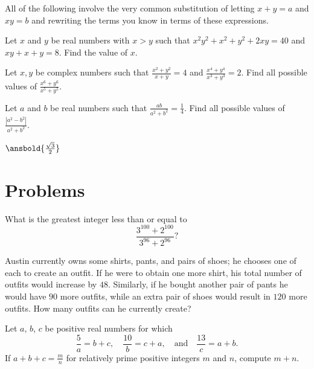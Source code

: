 \documentclass[mast]{lucky}
\begin{document}
All of the following involve the very common substitution of letting $x+y=a$ and $xy=b$ and rewriting the terms you know in terms of these expressions.
\begin{exam}
Let $x$ and $y$ be real numbers with $x > y$ such that $x^2 y^2 + x^2 + y^2 + 2xy = 40$ and $xy + x + y = 8$. Find
the value of $x$.
\end{exam}

\begin{exam}
Let $x,y$ be complex numbers such that $\frac{x^2+y^2}{x+y} = 4$ and $\frac{x^4+y^4}{x^3+y^3} = 2$. Find all possible values of 
$\frac{x^6+y^6}{x^5+y^5}$.
\end{exam}

\begin{exam}
Let $a$ and $b$ be real numbers such that $\frac{ab}{a^2+b^2}=\frac{1}{4}$. Find all possible values of $\frac{|a^2-b^2|}{a^2+b^2}$.
\end{exam}

\begin{sol}
$\ansbold{\frac{\sqrt{3}}{2}}$
\end{sol}


\pagebreak\section{Problems}

\minpt{}


\begin{prob}[AMC 10A 2018/14]{2}
What is the greatest integer less than or equal to\[\frac{3^{100}+2^{100}}{3^{96}+2^{96}}?\]
\end{prob}

\begin{prob}[2008-2009 Mandelbrot]{3}
Austin currently owns some shirts, pants, and pairs of shoes; he chooses one of each to create an outfit. If he were to obtain one more shirt, his total number of outfits would increase by $48.$ Similarly, if he bought another pair of pants he would have $90$ more outfits, while an extra pair of shoes would result in $120$ more outfits. How many outfits can he currently create?
\end{prob}
  

\begin{prob}{4}
Let $a$, $b$, $c$ be positive real numbers for which
\[
  \frac{5}{a} = b+c, \quad
  \frac{10}{b} = c+a, \quad \text{and} \quad
  \frac{13}{c} = a+b.
\]
If $a+b+c = \frac mn$ for relatively prime positive integers $m$ and $n$, compute $m+n$.
\end{prob}
  
\end{document}
